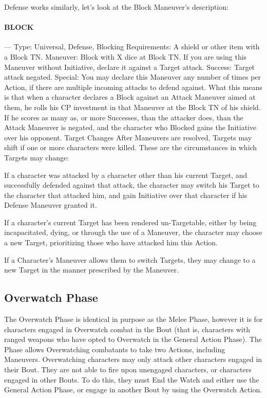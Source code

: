 \documentclass[oneside,11pt,english]{book}
\begin{document}
Defense works similarly, let’s look at the Block Maneuver’s description:
\paragraph{\large BLOCK}---\quad{\large[X]}
Type: Universal, Defense, Blocking
Requirements: A shield or other item with a Block TN.
Maneuver: Block with X dice at Block TN. If you are using this Maneuver without Initiative,
declare it against a Target attack.
Success: Target attack negated.
Special: You may declare this Maneuver any number of times per Action, if there are multiple
incoming attacks to defend against.
What this means is that when a character declares a Block against an Attack Maneuver aimed at them, he
rolls his CP investment in that Maneuver at the Block TN of his shield. If he scores as many as, or more
Successes, than the attacker does, than the Attack Maneuver is negated, and the character who Blocked
gains the Initiative over his opponent.
Target Changes
After Maneuvers are resolved, Targets may shift if one or more characters were killed. These are the
circumstances in which Targets may change:

If a character was attacked by a character other than his current Target, and successfully defended
against that attack, the character may switch his Target to the character that attacked him, and
gain Initiative over that character if his Defense Maneuver granted it.

If a character’s current Target has been rendered un-Targetable, either by being incapacitated,
dying, or through the use of a Maneuver, the character may choose a new Target, prioritizing
those who have attacked him this Action.

If a Character’s Maneuver allows them to switch Targets, they may change to a new Target in the
manner prescribed by the Maneuver.

\subsection{Overwatch Phase}
The Overwatch Phase is identical in purpose as the Melee Phase, however it is for characters engaged in
Overwatch combat in the Bout (that is, characters with ranged weapons who have opted to Overwatch in
the General Action Phase). The Phase allows Overwatching combatants to take two Actions, including
Maneuvers.
Overwatching characters may only attack other characters engaged in their Bout. They are not able to fire
upon unengaged characters, or characters engaged in other Bouts. To do this, they must End the Watch
and either use the General Action Phase, or engage in another Bout by using the Overwatch Action.
\end{document}
